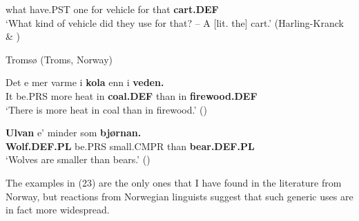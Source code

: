 what  have.PST  one  for  vehicle  for  that    \textbf{cart.DEF}\\

\glt ‘What kind of vehicle did they use for that? – A [lit. the] cart.’ (Harling-Kranck \& \citet[42]{Mara1998})

\z

\item 

\label{bkm:Ref135628619}Tromsø (Troms, Norway)



\item 


 \ea\label{}
\gll Det  e  mer  varme  i  \textbf{kola} enn  i  \textbf{veden.}\\


It  be.PRS  more  heat  in  \textbf{coal.DEF} than  in  \textbf{firewood.DEF}\\

\glt ‘There is more heat in coal than in firewood.’ (\citet[19]{Iversen1918})

\z

\item 


 \ea\label{}
\gll \textbf{Ulvan} e’  minder  som  \textbf{bjørnan.}\\


\textbf{Wolf.DEF.PL} be.PRS  small.CMPR  than  \textbf{bear.DEF.PL}\\

\glt ‘Wolves are smaller than bears.’ (\citet[18]{Iversen1918})

\z

The examples in (23) are the only ones that I have found in the literature from Norway, but reactions from Norwegian linguists suggest that such generic uses are in fact more widespread. 

